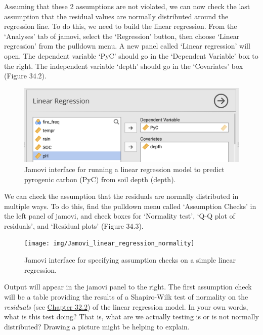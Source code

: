 \documentclass[
]{scrbook}
\begin{document}
Assuming that these 2 assumptions are not violated, we can now check the last assumption that the residual values are normally distributed around the regression line.
To do this, we need to build the linear regression.
From the `Analyses' tab of jamovi, select the `Regression' button, then choose `Linear regression' from the pulldown menu.
A new panel called `Linear regression' will open.
The dependent variable `PyC' should go in the `Dependent Variable' box to the right.
The independent variable `depth' should go in the `Covariates' box (Figure 34.2).

\begin{figure}
\includegraphics[width=1\linewidth]{img/Jamovi_linear_regression} \caption{Jamovi interface for running a linear regression model to predict pyrogenic carbon (PyC) from soil depth (depth).}\label{fig:unnamed-chunk-177}
\end{figure}

We can check the assumption that the residuals are normally distributed in multiple ways.
To do this, find the pulldown menu called `Assumption Checks' in the left panel of jamovi, and check boxes for `Normality test', `Q-Q plot of residuals', and `Residual plots' (Figure 34.3).

\begin{figure}
\texttt{[image: img/Jamovi\_linear\_regression\_normality]} \caption{Jamovi interface for specifying assumption checks on a simple linear regression.}\label{fig:unnamed-chunk-178}
\end{figure}

Output will appear in the jamovi panel to the right.
The first assumption check will be a table providing the results of a Shapiro-Wilk test of normality on the \emph{residuals} (see \protect\hyperlink{intercepts-slopes-and-residuals}{Chapter 32.2}) of the linear regression model.
In your own words, what is this test doing?
That is, what are we actually testing is or is not normally distributed?
Drawing a picture might be helping to explain.

\begin{verbatim}







\end{verbatim}
\end{document}
